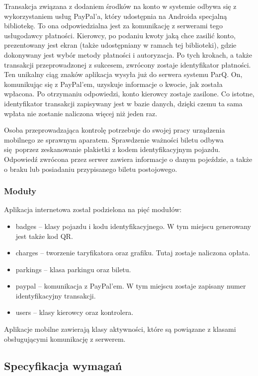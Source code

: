 Transakcja związana z dodaniem środków na konto w systemie odbywa się z wykorzystaniem usług PayPal'a, który udostępnia na Androida specjalną bibliotekę. To ona odpowiedzialna jest za komunikację z serwerami tego usługodawcy płatności. Kierowcy, po podaniu kwoty jaką chce zasilić konto, prezentowany jest ekran (także udostępniany w ramach tej biblioteki), gdzie dokonywany jest wybór metody płatności i autoryzacja. Po tych krokach, a także transakcji przeprowadzonej z sukcesem, zwrócony zostaje identyfikator płatności. Ten unikalny ciąg znaków aplikacja wysyła już do serwera systemu ParQ. On, komunikując się z PayPal'em, uzyskuje informacje o kwocie, jak została wpłacona. Po otrzymaniu odpowiedzi, konto kierowcy zostaje zasilone. Co istotne, identyfikator transakcji zapisywany jest w bazie danych, dzięki czemu ta sama wpłata nie zostanie naliczona więcej niż jeden raz.

Osoba przeprowadzająca kontrolę potrzebuje do swojej pracy urządzenia mobilnego ze sprawnym aparatem. Sprawdzenie ważności biletu odbywa się poprzez zeskanowanie plakietki z kodem identyfikacyjnym pojazdu. Odpowiedź zwrócona przez serwer zawiera informacje o danym pojeździe, a także o braku lub posiadaniu przypisanego biletu postojowego.

\subsubsection*{Moduły}

Aplikacja internetowa został podzielona na pięć modułów:

\begin{itemize}
	\item badges -- klasy pojazdu i kodu identyfikacyjnego. W tym miejscu generowany jest także kod QR. 
	\item charges -- tworzenie taryfikatora oraz grafiku. Tutaj zostaje naliczona opłata.
	\item parkings -- klasa parkingu oraz biletu.
	\item paypal -- komunikacja z PayPal'em. W tym miejscu zostaje zapisany numer identyfikacyjny transakcji.
	\item users -- klasy kierowcy oraz kontrolera.
\end{itemize}

Aplikacje mobilne zawierają klasy aktywności, które są powiązane z klasami obsługującymi komunikację z serwerem.

\subsection{Specyfikacja wymagań}

